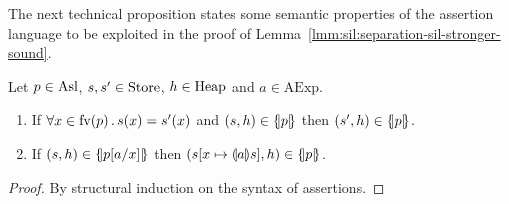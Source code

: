 The next technical proposition states some semantic properties of the assertion language to be exploited in the proof of Lemma~\ref{lmm:sil:separation-sil-stronger-sound}.

\begin{prop}\label{prop:app:sl-sat}
	Let $p \in \text{Asl}$, $s, s' \in \text{Store}$, $h \in \text{Heap}$ and $a \in \text{AExp}$.
	\begin{enumerate}
		\item If $\forall x \in \text{fv}(p) \,.\, s(x) = s'(x)$ and $(s, h) \in \{\hspace{-2pt}|p|\hspace{-2pt}\}$ then $(s', h) \in \{\hspace{-2pt}|p|\hspace{-2pt}\}$.
		\item If $(s, h) \in \{\hspace{-2pt}|p[a / x]|\hspace{-2pt}\}$ then $(s[x \mapsto \llparenthesis a\rrparenthesis s], h) \in \{\hspace{-2pt}|p|\hspace{-2pt}\}$.
	\end{enumerate}
\end{prop}
\begin{proof}
	By structural induction on the syntax of assertions.
\end{proof}

